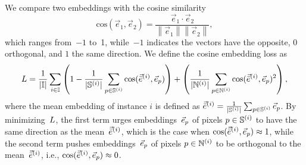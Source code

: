 \documentclass[runningheads,a4paper]{llncs}
\newcommand\norm[1]{\left\lVert#1\right\rVert}
\newcommand{\christian}[1]{\textcolor{blue}{[#1]}}
\newcommand{\thomas}[1]{\textcolor{purple}{[#1]}}
\begin{document}
We compare two embeddings with the cosine similarity
\begin{equation}
\text{cos}(\vec{e}_1,\vec{e}_2)=\frac{\vec{e}_1\cdot\vec{e}_2}{\norm{\vec{e}_1}\norm{\vec{e}_2}},
\end{equation}
which ranges from~$-1$ to~1, while~$-1$ indicates the vectors have the opposite, $0$ orthogonal, and $1$ the same direction.
We define the cosine embedding loss as
\begin{equation}
L=\frac{1}{|\mathbb{I}|}\sum_{i\in\mathbb{I}}\left(1-\frac{1}{|\mathbb{S}^{(i)}|}\sum_{p\in\mathbb{S}^{(i)}}{\text{cos}(\vec{\bar{e}}^{(i)},\vec{e}_p)}\right) + \left(\frac{1}{|\mathbb{N}^{(i)}|}\sum_{p\in\mathbb{N}^{(i)}}{\text{cos}(\vec{\bar{e}}^{(i)},\vec{e}_p)^2}\right),
\end{equation}
where the mean embedding of instance $i$ is defined as
$\vec{\bar{e}}^{(i)}=\frac{1}{|\mathbb{S}^{(i)}|}\sum_{p\in \mathbb{S}^{(i)}}{\vec{e}_p}$.
By minimizing~$L$, the first term urges embeddings~$\vec{e}_p$ of pixels $p\in\mathbb{S}^{(i)}$ to have the same direction as the mean~$\vec{\bar{e}}^{(i)}$, which is the case when $\text{cos}(\vec{\bar{e}}^{(i)},\vec{e}_p)\approx1$, while the second term pushes embeddings~$\vec{e}_p$ of pixels $p\in\mathbb{N}^{(i)}$ to be orthogonal to the mean~$\vec{\bar{e}}^{(i)}$, i.e., $\text{cos}(\vec{\bar{e}}^{(i)},\vec{e}_p)\approx0$.
\end{document}
